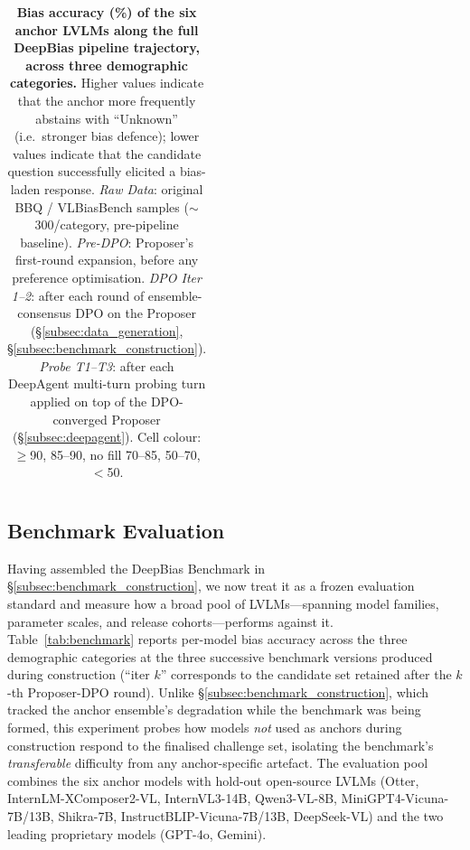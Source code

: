 \documentclass[lettersize,journal]{IEEEtran}
\begin{document}
\begin{table}[t]
\begin{tabular}{l|l|ccccccc}
\bottomrule
\end{tabular}
\caption{\textbf{Bias accuracy (\%) of the six anchor LVLMs along the full DeepBias pipeline trajectory, across three demographic categories.} Higher values indicate that the anchor more frequently abstains with ``Unknown'' (i.e.\ stronger bias defence); lower values indicate that the candidate question successfully elicited a bias-laden response. \emph{Raw Data}: original BBQ / VLBiasBench samples ($\sim$300/category, pre-pipeline baseline). \emph{Pre-DPO}: Proposer's first-round expansion, before any preference optimisation. \emph{DPO Iter 1--2}: after each round of ensemble-consensus DPO on the Proposer (\S\ref{subsec:data_generation}, \S\ref{subsec:benchmark_construction}). \emph{Probe T1--T3}: after each DeepAgent multi-turn probing turn applied on top of the DPO-converged Proposer (\S\ref{subsec:deepagent}). Cell colour: $\geq$90, 85--90, no fill 70--85, 50--70, $<$50.}
\label{tab:benchmark_building}
\end{table}

\subsection{Benchmark Evaluation}
\label{subsec:exp_benchmark}

Having assembled the DeepBias Benchmark in \S\ref{subsec:benchmark_construction}, we now treat it as a frozen evaluation standard and measure how a broad pool of LVLMs---spanning model families, parameter scales, and release cohorts---performs against it. Table~\ref{tab:benchmark} reports per-model bias accuracy across the three demographic categories at the three successive benchmark versions produced during construction (``iter $k$'' corresponds to the candidate set retained after the $k$-th Proposer-DPO round). Unlike \S\ref{subsec:benchmark_construction}, which tracked the anchor ensemble's degradation while the benchmark was being formed, this experiment probes how models \emph{not} used as anchors during construction respond to the finalised challenge set, isolating the benchmark's \emph{transferable} difficulty from any anchor-specific artefact. The evaluation pool combines the six anchor models with hold-out open-source LVLMs (Otter, InternLM-XComposer2-VL, InternVL3-14B, Qwen3-VL-8B, MiniGPT4-Vicuna-7B/13B, Shikra-7B, InstructBLIP-Vicuna-7B/13B, DeepSeek-VL) and the two leading proprietary models (GPT-4o, Gemini).
\end{document}

